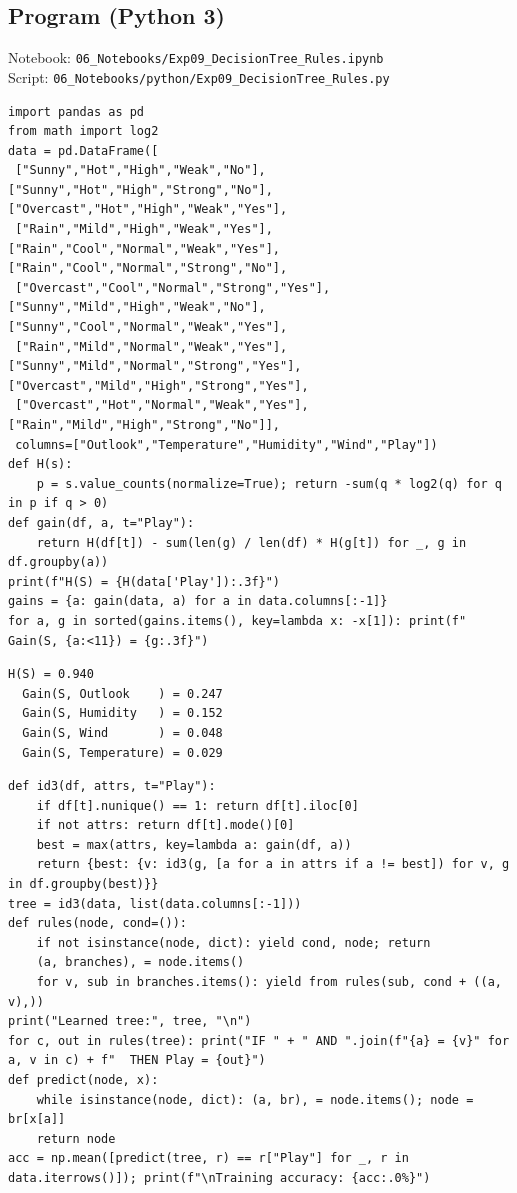 \documentclass[11pt]{article}
\begin{document}
\subsection*{Program (Python 3)}
{\small\color{slate}Notebook: \texttt{06\_Notebooks/Exp09\_DecisionTree\_Rules.ipynb}\\ Script: \texttt{06\_Notebooks/python/Exp09\_DecisionTree\_Rules.py}}
\begin{lstlisting}[style=py]
import pandas as pd
from math import log2
data = pd.DataFrame([
 ["Sunny","Hot","High","Weak","No"],["Sunny","Hot","High","Strong","No"],["Overcast","Hot","High","Weak","Yes"],
 ["Rain","Mild","High","Weak","Yes"],["Rain","Cool","Normal","Weak","Yes"],["Rain","Cool","Normal","Strong","No"],
 ["Overcast","Cool","Normal","Strong","Yes"],["Sunny","Mild","High","Weak","No"],["Sunny","Cool","Normal","Weak","Yes"],
 ["Rain","Mild","Normal","Weak","Yes"],["Sunny","Mild","Normal","Strong","Yes"],["Overcast","Mild","High","Strong","Yes"],
 ["Overcast","Hot","Normal","Weak","Yes"],["Rain","Mild","High","Strong","No"]],
 columns=["Outlook","Temperature","Humidity","Wind","Play"])
def H(s):
    p = s.value_counts(normalize=True); return -sum(q * log2(q) for q in p if q > 0)
def gain(df, a, t="Play"):
    return H(df[t]) - sum(len(g) / len(df) * H(g[t]) for _, g in df.groupby(a))
print(f"H(S) = {H(data['Play']):.3f}")
gains = {a: gain(data, a) for a in data.columns[:-1]}
for a, g in sorted(gains.items(), key=lambda x: -x[1]): print(f"  Gain(S, {a:<11}) = {g:.3f}")
\end{lstlisting}
\begin{lstlisting}[style=out]
H(S) = 0.940
  Gain(S, Outlook    ) = 0.247
  Gain(S, Humidity   ) = 0.152
  Gain(S, Wind       ) = 0.048
  Gain(S, Temperature) = 0.029
\end{lstlisting}
\begin{lstlisting}[style=py]
def id3(df, attrs, t="Play"):
    if df[t].nunique() == 1: return df[t].iloc[0]
    if not attrs: return df[t].mode()[0]
    best = max(attrs, key=lambda a: gain(df, a))
    return {best: {v: id3(g, [a for a in attrs if a != best]) for v, g in df.groupby(best)}}
tree = id3(data, list(data.columns[:-1]))
def rules(node, cond=()):
    if not isinstance(node, dict): yield cond, node; return
    (a, branches), = node.items()
    for v, sub in branches.items(): yield from rules(sub, cond + ((a, v),))
print("Learned tree:", tree, "\n")
for c, out in rules(tree): print("IF " + " AND ".join(f"{a} = {v}" for a, v in c) + f"  THEN Play = {out}")
def predict(node, x):
    while isinstance(node, dict): (a, br), = node.items(); node = br[x[a]]
    return node
acc = np.mean([predict(tree, r) == r["Play"] for _, r in data.iterrows()]); print(f"\nTraining accuracy: {acc:.0%}")
\end{lstlisting}
\end{document}
